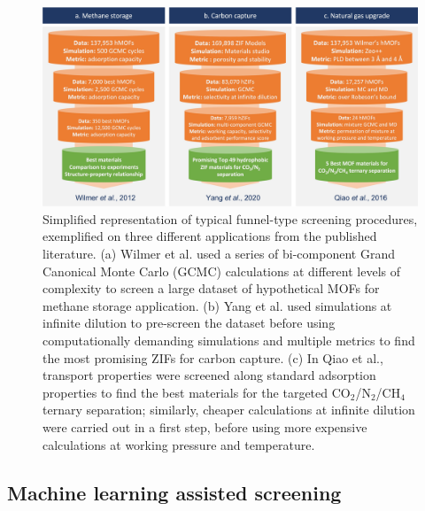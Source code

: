 \documentclass[main.tex]{subfiles}
\begin{document}
\begin{figure}[t]
    \centering
      \includegraphics[width=\textwidth]{figures/1-screening/Screening_procedures.jpg}
      \caption{Simplified representation of typical funnel-type screening procedures, exemplified on three different applications from the published literature. (a) Wilmer et al.\cite{Wilmer_2012} used a series of bi-component Grand Canonical Monte Carlo (GCMC) calculations at different levels of complexity to screen a large dataset of hypothetical MOFs for methane storage application. (b) Yang et al.\cite{Yang_2020} used simulations at infinite dilution to pre-screen the dataset before using computationally demanding simulations and multiple metrics to find the most promising ZIFs for carbon capture. (c) In Qiao et al.\cite{Qiao_2016}, transport properties were screened along standard adsorption properties to find the best materials for the targeted CO$_2$/N$_2$/CH$_4$ ternary separation; similarly, cheaper calculations at infinite dilution were carried out in a first step, before using more expensive calculations at working pressure and temperature.}\label{fgr:screening}
    \end{figure}

\subsection{Machine learning assisted screening}

\end{document}
